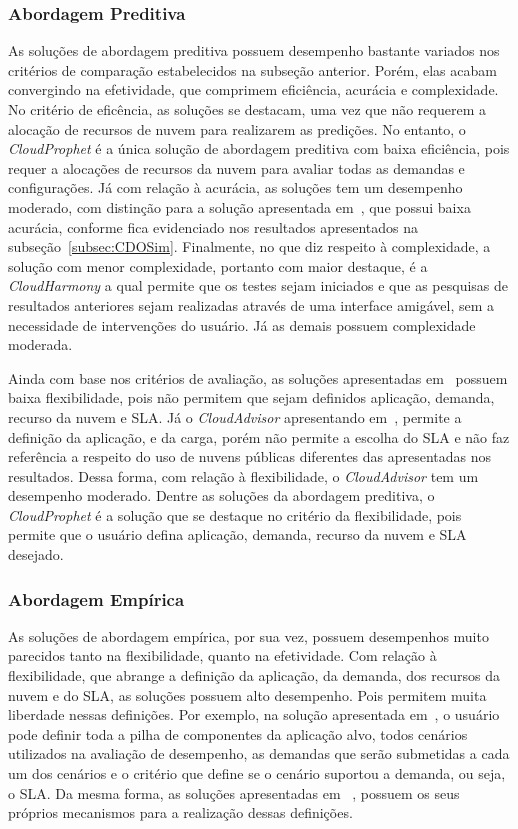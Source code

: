 \subsubsection{Abordagem Preditiva}
As soluções de abordagem preditiva possuem desempenho bastante variados nos
critérios de comparação estabelecidos na subseção anterior. Porém, elas
acabam convergindo na efetividade, que comprimem eficiência, acurácia e
complexidade. No critério de eficência, as soluções se destacam, uma vez que não requerem a alocação de recursos de nuvem para
realizarem as predições. No entanto, o \textit{CloudProphet} é a única solução
de abordagem preditiva com baixa eficiência, pois requer a alocações de recursos da nuvem para
avaliar todas as demandas e configurações. Já com relação à acurácia, as
soluções tem um desempenho moderado, com distinção para a solução apresentada
em~\cite{fittkau2012cdosim}, que possui baixa acurácia, conforme fica
evidenciado nos resultados apresentados na subseção~\ref{subsec:CDOSim}.
Finalmente, no que diz respeito à complexidade, a solução com menor
complexidade, portanto com maior destaque, é a \textit{CloudHarmony} a qual
permite que os testes sejam iniciados e que as pesquisas de resultados
anteriores sejam realizadas através de uma interface amigável, sem a necessidade de intervenções do usuário.
Já as demais possuem complexidade moderada.
 
Ainda com base nos critérios de avaliação, as soluções apresentadas
em~\cite{malkowski2010cloudxplor,cloudharmony} possuem baixa flexibilidade, pois
não permitem que sejam definidos aplicação, demanda, recurso da nuvem e SLA. Já
o \textit{CloudAdvisor} apresentando em~\cite{jung2013cloudadvisor}, permite a
definição da aplicação, e da carga, porém não permite a escolha do SLA e não
faz referência a respeito do uso de nuvens públicas diferentes das apresentadas
nos resultados. Dessa forma, com relação à flexibilidade, o \textit{CloudAdvisor}
tem um desempenho moderado. Dentre as soluções da abordagem preditiva, o \textit{CloudProphet}
é a solução que se destaque no critério da flexibilidade, pois permite que o
usuário defina aplicação, demanda, recurso da nuvem e SLA desejado.

\subsubsection{Abordagem Empírica}
As soluções de abordagem empírica, por sua vez, possuem desempenhos muito
parecidos tanto na flexibilidade, quanto na efetividade. Com relação à
flexibilidade, que abrange a definição da aplicação, da demanda, dos recursos da
nuvem e do SLA, as soluções possuem alto desempenho. Pois permitem muita
liberdade nessas definições. Por exemplo, na solução apresentada
em~\cite{cunhacloud}, o usuário pode definir toda a pilha de componentes
da aplicação alvo, todos cenários utilizados na avaliação de desempenho, as
demandas que serão submetidas a cada um dos cenários e o critério que define se
o cenário suportou a demanda, ou seja, o SLA. Da mesma forma, as soluções
apresentadas em ~\cite{jayasinghe2012,silva2013cloudbench,scheuner2014cloud},
possuem os seus próprios mecanismos para a realização dessas definições.

